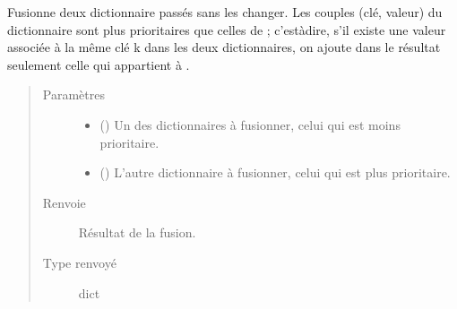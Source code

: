 \documentclass[letterpaper,10pt,french]{sphinxmanual}
\begin{document}

\begin{fulllineitems}
\label{\detokenize{index:DecisionTheoreticTroubleshooting.merge_dicts}}
Fusionne deux dictionnaire passés sans les changer. Les couples (clé,
valeur) du dictionnaire  sont plus prioritaires que celles de
 ; c’est\sphinxhyphen{}à\sphinxhyphen{}dire, s’il existe une valeur associée à la même clé k dans
les deux dictionnaires, on ajoute dans le résultat seulement celle qui
appartient à .
\begin{quote}\begin{description}
\item[{Paramètres}] \leavevmode\begin{itemize}
\item {} 
 () \textendash{} Un des dictionnaires à fusionner, celui qui est moins prioritaire.

\item {} 
 () \textendash{} L’autre dictionnaire à fusionner, celui qui est plus prioritaire.

\end{itemize}

\item[{Renvoie}] \leavevmode
{} \textendash{} Résultat de la fusion.

\item[{Type renvoyé}] \leavevmode
dict

\end{description}\end{quote}

\end{fulllineitems}

\end{document}
